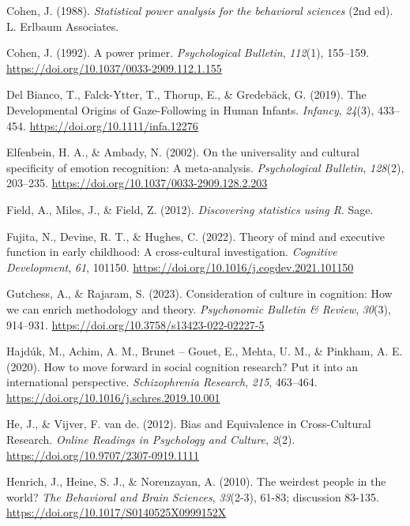 \documentclass[
  man,floatsintext]{apa7}
\newlength{\cslhangindent}
\newenvironment{CSLReferences}[2] %
 {\begin{list}{}{%
  \setlength{\itemindent}{0pt}
  \setlength{\leftmargin}{0pt}
  \setlength{\parsep}{0pt}
  \ifodd #1
   \setlength{\leftmargin}{\cslhangindent}
   \setlength{\itemindent}{-1\cslhangindent}
  \fi
  \setlength{\itemsep}{#2\baselineskip}}}
 {\end{list}}
\begin{document}
\begin{CSLReferences}{1}{0}
Cohen, J. (1988). \emph{Statistical power analysis for the behavioral sciences} (2nd ed). L. Erlbaum Associates.

Cohen, J. (1992). A power primer. \emph{Psychological Bulletin}, \emph{112}(1), 155--159. \url{https://doi.org/10.1037/0033-2909.112.1.155}

Del Bianco, T., Falck-Ytter, T., Thorup, E., \& Gredebäck, G. (2019). The {Developmental Origins} of {Gaze-Following} in {Human Infants}. \emph{Infancy}, \emph{24}(3), 433--454. \url{https://doi.org/10.1111/infa.12276}

Elfenbein, H. A., \& Ambady, N. (2002). On the universality and cultural specificity of emotion recognition: {A} meta-analysis. \emph{Psychological Bulletin}, \emph{128}(2), 203--235. \url{https://doi.org/10.1037/0033-2909.128.2.203}

Field, A., Miles, J., \& Field, Z. (2012). \emph{Discovering statistics using {R}}. Sage.

Fujita, N., Devine, R. T., \& Hughes, C. (2022). Theory of mind and executive function in early childhood: {A} cross-cultural investigation. \emph{Cognitive Development}, \emph{61}, 101150. \url{https://doi.org/10.1016/j.cogdev.2021.101150}

Gutchess, A., \& Rajaram, S. (2023). Consideration of culture in cognition: {How} we can enrich methodology and theory. \emph{Psychonomic Bulletin \& Review}, \emph{30}(3), 914--931. \url{https://doi.org/10.3758/s13423-022-02227-5}

Hajdúk, M., Achim, A. M., Brunet -- Gouet, E., Mehta, U. M., \& Pinkham, A. E. (2020). How to move forward in social cognition research? {Put} it into an international perspective. \emph{Schizophrenia Research}, \emph{215}, 463--464. \url{https://doi.org/10.1016/j.schres.2019.10.001}

He, J., \& Vijver, F. van de. (2012). Bias and {Equivalence} in {Cross-Cultural Research}. \emph{Online Readings in Psychology and Culture}, \emph{2}(2). \url{https://doi.org/10.9707/2307-0919.1111}

Henrich, J., Heine, S. J., \& Norenzayan, A. (2010). The weirdest people in the world? \emph{The Behavioral and Brain Sciences}, \emph{33}(2-3), 61-83; discussion 83-135. \url{https://doi.org/10.1017/S0140525X0999152X}


\end{CSLReferences}
\end{document}
